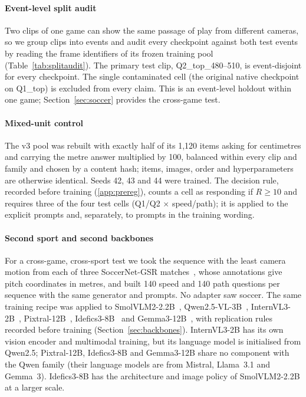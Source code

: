 \documentclass[preprint,number]{elsarticle}
\begin{document}
\paragraph{Event-level split audit}
Two clips of one game can show the same passage of play from different cameras,
so we group clips into events and audit every checkpoint against both test
events by reading the frame identifiers of its frozen training pool
(Table~\ref{tab:splitaudit}). The primary test clip, Q2\_top\_480--510, is
event-disjoint for every checkpoint. The single contaminated cell (the original
native checkpoint on Q1\_top) is excluded from every claim. This is an
event-level holdout within one game; Section~\ref{sec:soccer} provides the
cross-game test.

\begin{table}[t]
\centering\small
\setlength{\tabcolsep}{4pt}
\caption{Event-level split audit. \checkmark: the evaluation event is absent
  from the checkpoint's training pool; $\times$: seen through another camera.
  Generated from the frozen pools.}
\label{tab:splitaudit}
\resizebox{\linewidth}{!}{}
\end{table}

\paragraph{Mixed-unit control}
The v3 pool was rebuilt with exactly half of its 1,120 items asking for
centimetres and carrying the metre answer multiplied by 100, balanced within
every clip and family and chosen by a content hash; items, images, order and
hyperparameters are otherwise identical. Seeds 42, 43 and 44 were trained. The
decision rule, recorded before training (\ref{app:prereg}), counts a cell as
responding if $R\ge10$ and requires three of the four test cells
(Q1/Q2 $\times$ speed/path); it is applied to the explicit prompts and,
separately, to prompts in the training wording.

\paragraph{Second sport and second backbones}
For a cross-game, cross-sport test we took the sequence with the least camera
motion from each of three SoccerNet-GSR matches~\cite{soccernetgsr2024}, whose
annotations give pitch coordinates in metres, and built 140 speed and 140 path
questions per sequence with the same generator and prompts. No adapter saw
soccer. The same training recipe was applied to SmolVLM2-2.2B~\cite{smolvlm2025},
Qwen2.5-VL-3B~\cite{qwen25vl2025}, InternVL3-2B~\cite{internvl3_2025},
Pixtral-12B~\cite{pixtral2024}, Idefics3-8B~\cite{idefics3_2024} and
Gemma3-12B~\cite{gemma3_2025}, with replication rules recorded before training
(Section~\ref{sec:backbones}). InternVL3-2B has its own vision encoder and
multimodal training, but its language model is initialised from Qwen2.5;
Pixtral-12B, Idefics3-8B and Gemma3-12B share no component with the Qwen family
(their language models are from Mistral, Llama~3.1 and Gemma~3). Idefics3-8B
has the architecture and image policy of SmolVLM2-2.2B at a larger scale.
\end{document}
